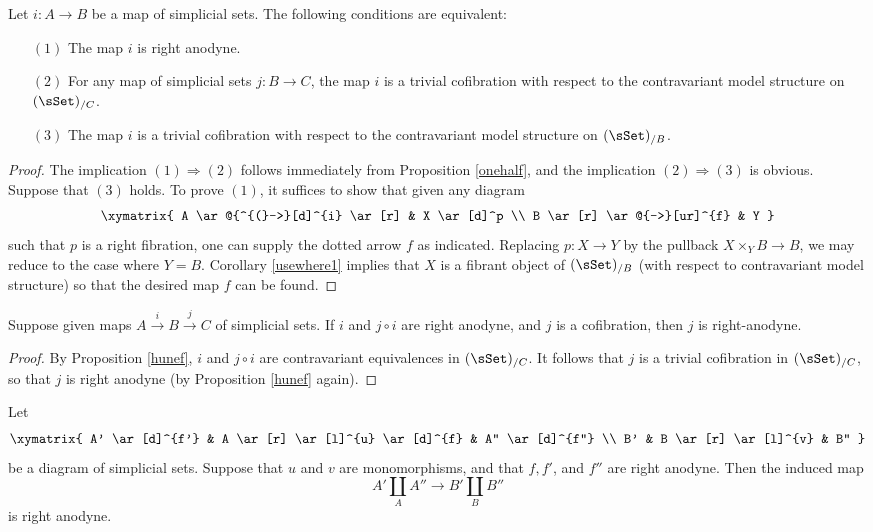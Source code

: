 \begin{proposition}\label{hunef}
Let $i: A \rightarrow B$ be a map of simplicial sets. The following conditions are equivalent:
\begin{itemize}
\item[$(1)$] The map $i$ is right anodyne.
\item[$(2)$] For any map of simplicial sets $j: B \rightarrow C$, the map $i$ is a trivial cofibration with respect
to the contravariant model structure on $(\sSet)_{/C}$.
\item[$(3)$] The map $i$ is a trivial cofibration with respect to the contravariant model structure on
$(\sSet)_{/B}$.
\end{itemize}
\end{proposition}

\begin{proof}
The implication $(1) \Rightarrow (2)$ follows immediately from Proposition \ref{onehalf}, and the implication $(2) \Rightarrow (3)$ is obvious. Suppose that $(3)$ holds. To prove $(1)$, it suffices to show that given any diagram
$$ \xymatrix{ A \ar@{^{(}->}[d]^{i} \ar[r] & X \ar[d]^p \\
B \ar[r] \ar@{-->}[ur]^{f} & Y }$$
such that $p$ is a right fibration, one can supply the dotted arrow $f$ as indicated. Replacing
$p: X \rightarrow Y$ by the pullback $X \times_{Y} B \rightarrow B$, we may reduce to the case where
$Y = B$. Corollary \ref{usewhere1} implies that $X$ is a fibrant object of $(\sSet)_{/B}$ (with respect to contravariant model structure) so that the desired map $f$ can be found.
\end{proof}

\begin{corollary}\label{nonobcomp}
Suppose given maps $A \stackrel{i}{\rightarrow} B \stackrel{j}{\rightarrow} C$ of simplicial
sets. If $i$ and $j \circ i$ are right anodyne, and $j$ is a cofibration, then $j$ is right-anodyne.
\end{corollary}

\begin{proof}
By Proposition \ref{hunef}, $i$ and $j \circ i$ are contravariant equivalences in $(\sSet)_{/C}$. It follows that $j$ is a trivial cofibration in $(\sSet)_{/C}$, so that $j$ is right anodyne (by Proposition \ref{hunef} again).
\end{proof}

\begin{corollary}\label{anothernonob}
Let $$ \xymatrix{ A' \ar[d]^{f'} & A \ar[r] \ar[l]^{u} \ar[d]^{f} & A'' \ar[d]^{f''} \\
B' & B \ar[r] \ar[l]^{v} & B'' }$$
be a diagram of simplicial sets. Suppose that $u$ and $v$ are monomorphisms,
and that $f, f'$, and $f''$ are right anodyne. Then the induced map
$$ A' \coprod_{A} A'' \rightarrow B' \coprod_{B} B''$$
is right anodyne.
\end{corollary}

